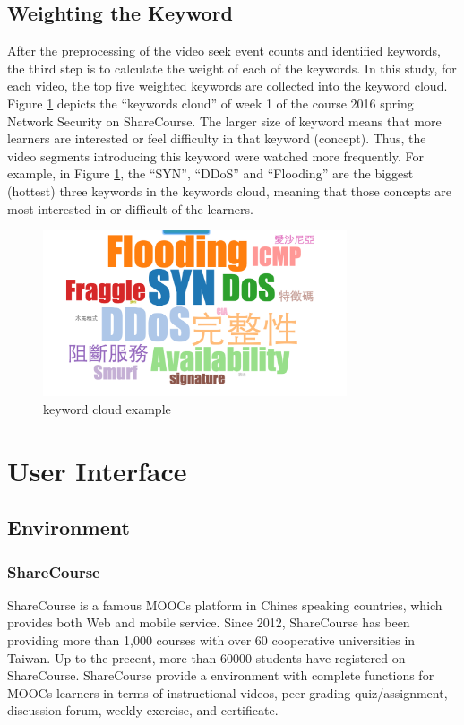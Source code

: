 \subsection{Weighting the Keyword}
After the preprocessing of the video seek event counts and identified keywords, the third step is to calculate the weight of each of the keywords. In this study, for each video, the top five weighted keywords are collected into the keyword cloud.
Figure \ref{fig:keywordcloud} depicts the “keywords cloud” of week 1 of the course 2016 spring Network Security on ShareCourse. The larger size of keyword means that more learners are interested or feel difficulty in that keyword (concept). Thus, the video segments introducing this keyword were watched more frequently.
For example, in Figure \ref{fig:keywordcloud}, the ``SYN'', ``DDoS'' and ``Flooding'' are the biggest (hottest) three keywords in the keywords cloud, meaning that those concepts are most interested in or difficult of the learners.

\begin{figure}[H]
    \centering
    \includegraphics[width = 0.8\textwidth]{fig/wordcloud.png}
    \caption{keyword cloud example}
    \label{fig:keywordcloud}
\end{figure}

\section{User Interface}
\subsection{Environment}
\subsubsection{ShareCourse}
ShareCourse \cite{sharecourse} is a famous MOOCs platform in Chines speaking countries, which provides both Web and mobile service.
Since 2012, ShareCourse has been providing more than 1,000 courses with over 60 cooperative universities in Taiwan.
Up to the precent, more than 60000 students have registered on ShareCourse.
ShareCourse provide a environment with complete functions for MOOCs learners in terms of instructional videos, peer-grading quiz/assignment, discussion forum, weekly exercise, and certificate.

